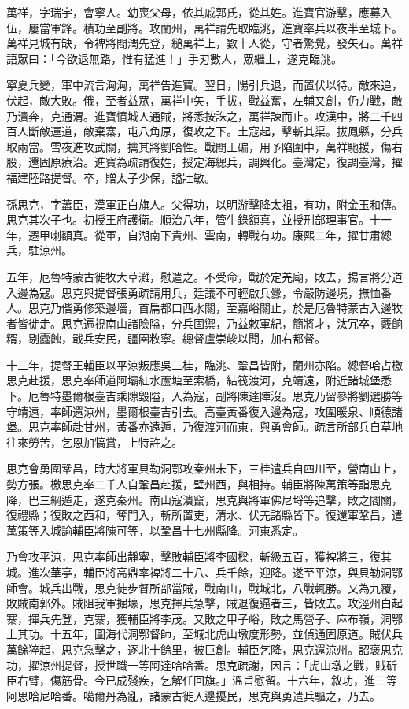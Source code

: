 \begin{pinyinscope}
萬祥，字瑞宇，會寧人。幼喪父母，依其戚郭氏，從其姓。進寶官游擊，應募入伍，屢當軍鋒。積功至副將。攻蘭州，萬祥請先取臨洮，進寶率兵以夜半至城下。萬祥見城有缺，令裨將閻潤先登，縋萬祥上，數十人從，守者驚覺，發矢石。萬祥語眾曰：「今欲退無路，惟有猛進！」手刃數人，眾繼上，遂克臨洮。

寧夏兵變，軍中流言洶洶，萬祥告進寶。翌日，陽引兵退，而置伏以待。敵來追，伏起，敵大敗。俄，至者益眾，萬祥中矢，手拔，戰益奮，左輔又創，仍力戰，敵乃潰奔，克通渭。進寶憤城人通賊，將悉按誅之，萬祥諫而止。攻漢中，將二千四百人斷敵運道，敵棄寨，屯八角原，復攻之下。土寇起，擊斬其渠。拔鳳縣，分兵取兩當。雪夜進攻武關，擒其將劉哈性。戰閻王碥，用予陷圍中，萬祥馳援，傷右股，還固原療治。進寶為疏請復姓，授定海總兵，調興化。臺灣定，復調臺灣，擢福建陸路提督。卒，贈太子少保，謚壯敏。

孫思克，字藎臣，漢軍正白旗人。父得功，以明游擊降太祖，有功，附金玉和傳。思克其次子也。初授王府護衛。順治八年，管牛錄額真，並授刑部理事官。十一年，遷甲喇額真。從軍，自湖南下貴州、雲南，轉戰有功。康熙二年，擢甘肅總兵，駐涼州。

五年，厄魯特蒙古徙牧大草灘，慰遣之。不受命，戰於定羌廟，敗去，揚言將分道入邊為寇。思克與提督張勇疏請用兵，廷議不可輕啟兵釁，令嚴防邊境，撫恤番人。思克乃偕勇修築邊墻，首扁都口西水關，至嘉峪關止，於是厄魯特蒙古入邊牧者皆徙走。思克遍視南山諸險隘，分兵固禦，乃益敕軍紀，簡將才，汰冗卒，覈餉糈，剔蠹蝕，戢兵安民，疆圉敉寧。總督盧崇峻以聞，加右都督。

十三年，提督王輔臣以平涼叛應吳三桂，臨洮、鞏昌皆附，蘭州亦陷。總督哈占檄思克赴援，思克率師道阿壩紅水蘆塘至索橋，結筏渡河，克靖遠，附近諸城堡悉下。厄魯特墨爾根臺吉乘隙毀隘，入為寇，副將陳達陣沒。思克乃留參將劉選勝等守靖遠，率師還涼州，墨爾根臺吉引去。高臺黃番復入邊為寇，攻圍暖泉、順德諸堡。思克率師赴甘州，黃番亦遠遁，乃復渡河而東，與勇會師。疏言所部兵自草地往來勞苦，乞恩加犒賞，上特許之。

思克會勇圍鞏昌，時大將軍貝勒洞鄂攻秦州未下，三桂遣兵自四川至，營南山上，勢方張。檄思克率二千人自鞏昌赴援，壁州西，與相持。輔臣將陳萬策等詣思克降，巴三綱遁走，遂克秦州。南山寇潰竄，思克與將軍佛尼埒等追擊，敗之閻關，復禮縣；復敗之西和，奪門入，斬所置吏，清水、伏羌諸縣皆下。復還軍鞏昌，遣萬策等入城諭輔臣將陳可等，以鞏昌十七州縣降。河東悉定。

乃會攻平涼，思克率師出靜寧，擊敗輔臣將李國樑，斬級五百，獲裨將三，復其城。進次華亭，輔臣將高鼎率裨將二十八、兵千餘，迎降。遂至平涼，與貝勒洞鄂師會。城兵出戰，思克徒步督所部當賊，戰南山，戰城北，八戰輒勝。又為九覆，敗賊南郭外。賊阻我軍掘壕，思克揮兵急擊，賊退復逼者三，皆敗去。攻涇州白起寨，揮兵先登，克寨，獲輔臣將李茂。又敗之甲子峪，敗之馬營子、麻布嶺，洞鄂上其功。十五年，圖海代洞鄂督師，至城北虎山墩度形勢，並偵通固原道。賊伏兵萬餘猝起，思克急擊之，逐北十餘里，被巨創。輔臣乞降，思克還涼州。詔褒思克功，擢涼州提督，授世職一等阿達哈哈番。思克疏謝，因言：「虎山墩之戰，賊斫臣右臂，傷筋骨。今已成殘疾，乞解任回旗。」溫旨慰留。十六年，敘功，進三等阿思哈尼哈番。噶爾丹為亂，諸蒙古徙入邊擾民，思克與勇遣兵驅之，乃去。


\end{pinyinscope}

